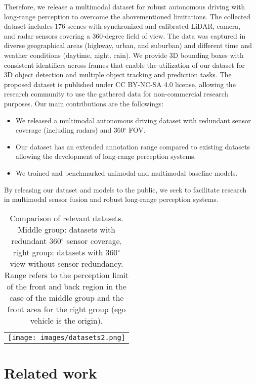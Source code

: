 \documentclass{article}
\begin{document}
Therefore, we release a multimodal dataset for robust autonomous driving with long-range perception to overcome the abovementioned limitations. The collected dataset includes 176 scenes with synchronized and calibrated LiDAR, camera, and radar sensors covering a 360-degree field of view. The data was captured in diverse geographical areas (highway, urban, and suburban) and different time and weather conditions (daytime, night, rain). We provide 3D bounding boxes with consistent identifiers across frames that enable the utilization of our dataset for 3D object detection and multiple object tracking and prediction tasks. The proposed dataset is published under CC BY-NC-SA 4.0 license, allowing the research community to use the gathered data for non-commercial research purposes. Our main contributions are the followings:
\begin{itemize}
  \item We released a multimodal autonomous driving dataset with redundant sensor coverage (including radars) and 360$^{\circ}$ FOV.
  \item Our dataset has an extended annotation range compared to existing datasets allowing the development of long-range perception systems.
  \item We trained and benchmarked unimodal and multimodal baseline models.
\end{itemize}

By releasing our dataset and models to the public, we seek to facilitate research in multimodal sensor fusion and robust long-range perception systems.

\begin{table}[t]
  \caption{Comparison of relevant datasets. Middle group: datasets with redundant 360$^{\circ}$ sensor coverage, right group: datasets with 360$^{\circ}$ view without sensor redundancy. Range refers to the perception limit of the front and back region in the case of the middle group and the front area for the right group (ego vehicle is the origin). }
  \centering  
  \begin{tabular}{c}       
    \texttt{[image: images/datasets2.png]}
  \end{tabular}  
  \label{tab:datasets}
\end{table}


\section{Related work}
\label{gen_inst}
\end{document}

